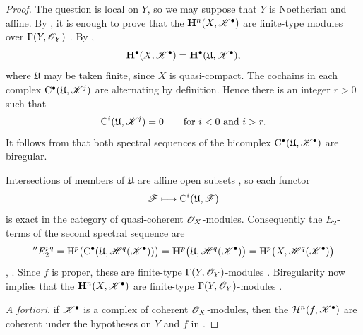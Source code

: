 \begin{proof}
The question is local on $Y$, so we may suppose that $Y$ is
Noetherian and affine.  By , it is enough to prove
that the $\mathbf{H}^n(X,\mathscr{K}^\bullet)$ are finite-type modules
over $\Gamma(Y,\mathscr{O}_Y)$ .  By
,
\[
  \mathbf{H}^\bullet(X,\mathscr{K}^\bullet)
  =
  \mathbf{H}^\bullet(\mathfrak{U},\mathscr{K}^\bullet),
\]
where $\mathfrak{U}$ may be taken finite, since $X$ is
quasi-compact.  The cochains in each complex
$\mathrm{C}^\bullet(\mathfrak{U},\mathscr{K}^j)$ are alternating by
definition.  Hence there is an integer $r>0$ such that
\[
  \mathrm{C}^i(\mathfrak{U},\mathscr{K}^j)=0
  \qquad\text{for }i<0\text{ and }i>r.
\]
It follows from  that both spectral sequences of
the bicomplex
$\mathrm{C}^\bullet(\mathfrak{U},\mathscr{K}^\bullet)$ are biregular.

Intersections of members of $\mathfrak{U}$ are affine open subsets
, so each functor
\[
  \mathscr{F}\longmapsto\mathrm{C}^i(\mathfrak{U},\mathscr{F})
\]
is exact in the category of quasi-coherent $\mathscr{O}_X$-modules.
Consequently the $E_2$-terms of the second spectral sequence are
\[
  ''E_2^{pq}
  =
  \mathrm H^p\bigl(
    \mathrm{C}^\bullet(
      \mathfrak{U},\mathscr{H}^q(\mathscr{K}^\bullet)
    )
  \bigr)
  =
  \mathbf{H}^p\bigl(
    \mathfrak{U},\mathscr{H}^q(\mathscr{K}^\bullet)
  \bigr)
  =
  \mathrm H^p\bigl(X,\mathscr{H}^q(\mathscr{K}^\bullet)\bigr)
\]
, .  Since $f$ is proper, these
are finite-type $\Gamma(Y,\mathscr{O}_Y)$-modules
.  Biregularity now implies that the
$\mathbf{H}^n(X,\mathscr{K}^\bullet)$ are finite-type
$\Gamma(Y,\mathscr{O}_Y)$-modules .

\emph{A fortiori}, if $\mathscr{K}^\bullet$ is a complex of coherent
$\mathscr{O}_X$-modules, then the
$\mathcal{H}^n(f,\mathscr{K}^\bullet)$ are coherent under the
hypotheses on $Y$ and $f$ in 
.
\end{proof}

